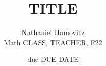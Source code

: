 \documentclass{article}
\begin{document}


\title{TITLE} %
\author{Nathaniel Hamovitz\\Math CLASS, TEACHER, F22}
\date{due DUE DATE}

\maketitle
\end{document}
